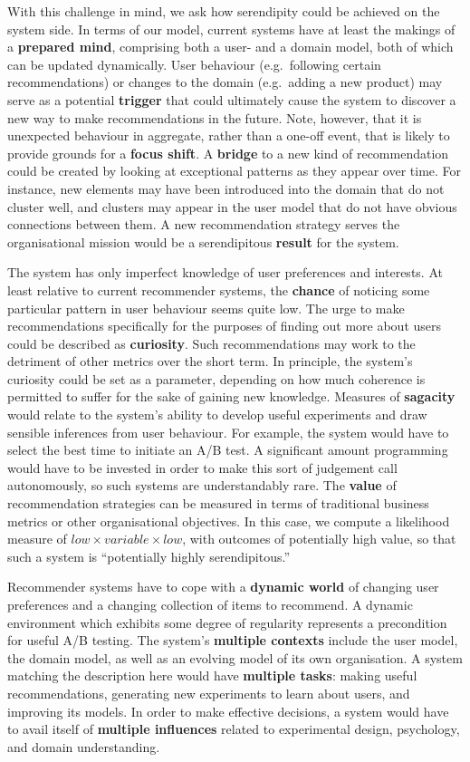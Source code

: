 With this challenge in mind, we ask how serendipity could be achieved on the system side. In terms of our model, current systems have at least the makings of a \textbf{prepared mind}, comprising both a user- and a domain model, both of which can be updated dynamically.  User behaviour (e.g.~following certain recommendations) or changes to the domain (e.g.~adding a new product) may serve as a potential \textbf{trigger} that could ultimately cause the system to discover a new way to make recommendations in the future.  Note, however, that it is unexpected behaviour in aggregate, rather than a one-off event, that is likely to provide grounds for a \textbf{focus shift}.   A \textbf{bridge} to a new kind of recommendation could be created by looking at exceptional patterns as they appear over time.  For instance, new elements may have been introduced into the domain that do not cluster well, and clusters may appear in the user model that do not have obvious connections between them.  A new recommendation strategy serves the organisational mission would be a serendipitous \textbf{result} for the system.

The system has only imperfect knowledge of user preferences and
interests.  At least relative to current recommender systems, the
\textbf{chance} of noticing some particular pattern in user behaviour
seems quite low.  The urge to make recommendations specifically for
the purposes of finding out more about users could be described as
\textbf{curiosity}.  Such recommendations may work to the detriment of
other metrics over the short term.  In principle, the system's
curiosity could be set as a parameter, depending on how much coherence
is permitted to suffer for the sake of gaining new knowledge.
Measures of \textbf{sagacity} would relate to the system's ability to
develop useful experiments and draw sensible inferences from user
behaviour.  For example, the system would have to select the best time
to initiate an A/B test.  A significant amount programming would have
to be invested in order to make this sort of judgement call
autonomously, so such systems are understandably rare.  The
\textbf{value} of recommendation strategies can be measured in terms
of traditional business metrics or other organisational objectives.
In this case, we compute a likelihood measure of
$\mathit{low}\times\mathit{variable}\times\mathit{low}$, with outcomes
of potentially high value, so that such a system is ``potentially
highly serendipitous.''

Recommender systems have to cope with a \textbf{dynamic world} of changing user preferences and a changing collection of items to recommend.  A dynamic environment which exhibits some degree of regularity represents a precondition for useful A/B testing.  The system's \textbf{multiple contexts} include the user model, the domain model, as well as an evolving model of its own organisation.  A system matching the description here would have \textbf{multiple tasks}: making useful recommendations, generating new experiments to learn about users, and improving its models.  In order to make effective decisions, a system would have to avail itself of \textbf{multiple influences} related to experimental design, psychology, and domain understanding.

